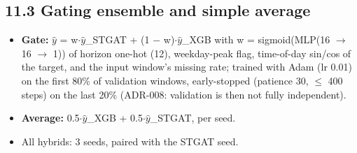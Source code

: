 \documentclass[10pt,a4paper]{article}
\begin{document}
\subsection*{11.3 Gating ensemble and simple average}
\begin{itemize}[nosep,leftmargin=*]
\item \textbf{Gate:} \ensuremath{\hat{y}} = w\ensuremath{\cdot}\ensuremath{\hat{y}}\_\allowbreak{}STGAT + (1 \ensuremath{-} w)\ensuremath{\cdot}\ensuremath{\hat{y}}\_\allowbreak{}XGB with w = sigmoid(MLP(16 \ensuremath{\rightarrow} 16 \ensuremath{\rightarrow} 1)) of horizon one-hot (12), weekday-peak flag, time-of-day sin/\allowbreak{}cos of the target, and the input window's missing rate; trained with Adam (lr 0.01) on the first 80\% of validation windows, early-stopped (patience 30, \ensuremath{\leq} 400 steps) on the last 20\% (ADR-008: validation is then not fully independent).
\item \textbf{Average:} 0.5\ensuremath{\cdot}\ensuremath{\hat{y}}\_\allowbreak{}XGB + 0.5\ensuremath{\cdot}\ensuremath{\hat{y}}\_\allowbreak{}STGAT, per seed.
\item All hybrids: 3 seeds, paired with the STGAT seed.
\end{itemize}
\end{document}

